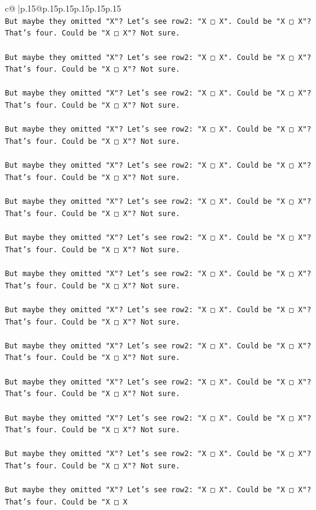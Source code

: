 \documentclass{article}
\begin{document}
{\begin{supertabular}{c@{$\;$}|p{.15\linewidth}@{}p{.15\linewidth}p{.15\linewidth}p{.15\linewidth}p{.15\linewidth}p{.15\linewidth}}
{{{\\ 
\texttt{But maybe they omitted "X"? Let's see row2: "X □ X". Could be "X □ X"? That's four. Could be "X □ X"? Not sure.} \\
\\ 
\texttt{But maybe they omitted "X"? Let's see row2: "X □ X". Could be "X □ X"? That's four. Could be "X □ X"? Not sure.} \\
\\ 
\texttt{But maybe they omitted "X"? Let's see row2: "X □ X". Could be "X □ X"? That's four. Could be "X □ X"? Not sure.} \\
\\ 
\texttt{But maybe they omitted "X"? Let's see row2: "X □ X". Could be "X □ X"? That's four. Could be "X □ X"? Not sure.} \\
\\ 
\texttt{But maybe they omitted "X"? Let's see row2: "X □ X". Could be "X □ X"? That's four. Could be "X □ X"? Not sure.} \\
\\ 
\texttt{But maybe they omitted "X"? Let's see row2: "X □ X". Could be "X □ X"? That's four. Could be "X □ X"? Not sure.} \\
\\ 
\texttt{But maybe they omitted "X"? Let's see row2: "X □ X". Could be "X □ X"? That's four. Could be "X □ X"? Not sure.} \\
\\ 
\texttt{But maybe they omitted "X"? Let's see row2: "X □ X". Could be "X □ X"? That's four. Could be "X □ X"? Not sure.} \\
\\ 
\texttt{But maybe they omitted "X"? Let's see row2: "X □ X". Could be "X □ X"? That's four. Could be "X □ X"? Not sure.} \\
\\ 
\texttt{But maybe they omitted "X"? Let's see row2: "X □ X". Could be "X □ X"? That's four. Could be "X □ X"? Not sure.} \\
\\ 
\texttt{But maybe they omitted "X"? Let's see row2: "X □ X". Could be "X □ X"? That's four. Could be "X □ X"? Not sure.} \\
\\ 
\texttt{But maybe they omitted "X"? Let's see row2: "X □ X". Could be "X □ X"? That's four. Could be "X □ X"? Not sure.} \\
\\ 
\texttt{But maybe they omitted "X"? Let's see row2: "X □ X". Could be "X □ X"? That's four. Could be "X □ X"? Not sure.} \\
\\ 
\texttt{But maybe they omitted "X"? Let's see row2: "X □ X". Could be "X □ X"? That's four. Could be "X □ X} \\
            }
        }
    }
     \\ \\


\end{supertabular}}
\end{document}
